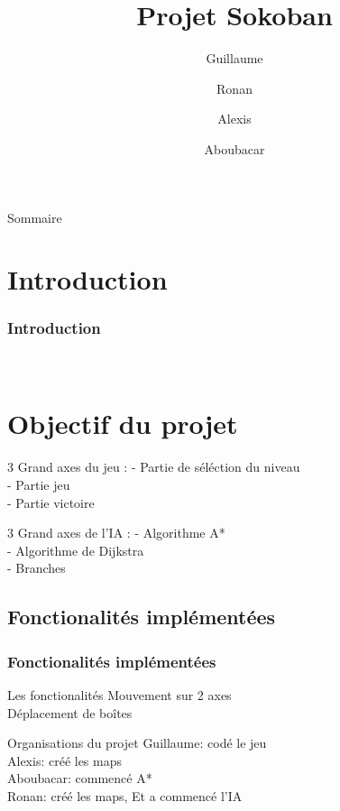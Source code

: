 \documentclass{beamer}
\title{Projet Sokoban}
\author{Guillaume \and Ronan \and Alexis \and Aboubacar}
\institute{Université de Caen Normandie \\ Conception logiciel}
\begin{document}
\begin{frame}
\titlepage
\end{frame}


\begin{frame}{Sommaire}
\tableofcontents
\end{frame}

\section{Introduction} 
\begin{frame}
\frametitle{Introduction}
 \\
\end{frame}

\section{Objectif du projet}
\begin{frame}
\begin{block}{3 Grand axes du jeu :}
- Partie de séléction du niveau \\ 
- Partie jeu  \\
- Partie victoire \\
\end{block}
\begin{block}{3 Grand axes de l'IA :}
- Algorithme A* \\
- Algorithme de Dijkstra \\
- Branches 
\end{block}
\end{frame}


\begin{frame}
\section{Fonctionalités implémentées}
\frametitle{Fonctionalités implémentées}
\begin{block}{Les fonctionalités}
Mouvement sur 2 axes \\
Déplacement de boîtes 
\end{block}
\begin{block}{Organisations du projet}
Guillaume: codé le jeu \\ 
Alexis: créé les maps \\
Aboubacar: commencé A*  \\
Ronan: créé les maps, Et a commencé l'IA
\end{block}
\end{frame}
\end{document}
